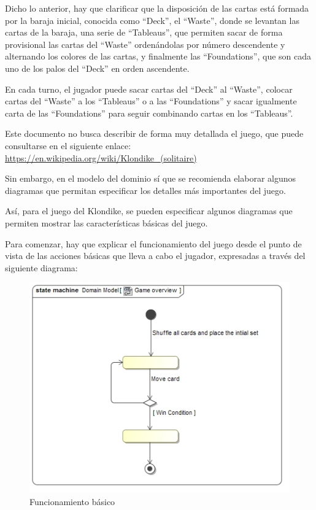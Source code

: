 \documentclass[11pt]{article}
\begin{document}
Dicho lo anterior, hay que clarificar que la disposición de las cartas está formada por la baraja inicial, conocida como ``Deck'', el ``Waste'', donde se levantan las cartas de la baraja, una serie de ``Tableaus'', que permiten sacar de forma provisional las cartas del ``Waste'' ordenándolas por número descendente y alternando los colores de las cartas, y finalmente las ``Foundations'', que son cada uno de los palos del ``Deck'' en orden ascendente.

En cada turno, el jugador puede sacar cartas del ``Deck'' al ``Waste'', colocar cartas del ``Waste'' a los ``Tableaus'' o a las ``Foundations'' y sacar igualmente carta de las ``Foundations'' para seguir combinando cartas en los ``Tableaus''.

Este documento no busca describir de forma muy detallada el juego, que puede consultarse en el siguiente enlace: \url{https://en.wikipedia.org/wiki/Klondike_(solitaire)}

Sin embargo, en el modelo del dominio sí que se recomienda elaborar algunos diagramas que permitan especificar los detalles más importantes del juego.

Así, para el juego del Klondike, se pueden especificar algunos diagramas que permiten mostrar las características básicas del juego.

Para comenzar, hay que explicar el funcionamiento del juego desde el punto de vista de las acciones básicas que lleva a cabo el jugador, expresadas a través del siguiente diagrama:

\begin{center}
 \begin{figure}[H]
 \begin{center}
   \includegraphics[width=15cm]{DomainModel/GameOverview00.jpg}
   \caption{Funcionamiento básico}
   \label{fig:gamebasics}
 \end{center}
 \end{figure}
\end{center}
\end{document}
